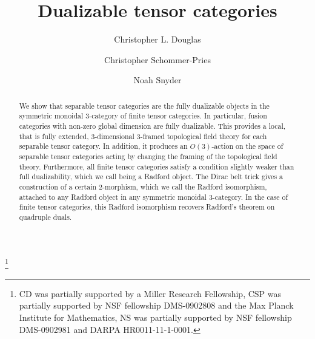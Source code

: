 \documentclass{amsart}
\begin{document}
\title{Dualizable tensor categories}

\begin{abstract}
We show that separable tensor categories are the fully dualizable objects in the symmetric monoidal $3$-category of finite tensor categories.  In particular, fusion categories with non-zero global dimension are fully dualizable.   This provides a local, that is fully extended, 3-dimensional 3-framed topological field theory for each separable tensor category. In addition, it produces an $O(3)$-action on the space of separable tensor categories acting by changing the framing of the topological field theory. Furthermore, all finite tensor categories satisfy a condition slightly weaker than full dualizability, which we call being a Radford object.  The Dirac belt trick gives a construction of a certain $2$-morphism, which we call the Radford isomorphism, attached to any Radford object in any symmetric monoidal $3$-category.  In the case of finite tensor categories, this Radford isomorphism recovers Radford's theorem on quadruple duals.

\end{abstract}

\author{Christopher L. Douglas}
\address{Mathematical Institute\\ University of Oxford\\ Oxford OX1 3LB\\ United Kingdom}
      	
\author{Christopher Schommer-Pries}
\address{Department of Mathematics\\ Max Planck Institute for Mathematics \\ 53111 Bonn \\ Germany}

\author{Noah Snyder}
\address{Department of Mathematics\\ Indiana University\\ Bloomington, IN 47401\\ USA}

\thanks{CD was partially supported by a Miller Research Fellowship, CSP was partially supported by NSF fellowship DMS-0902808 and the Max Planck Institute for Mathematics,  NS was partially supported by NSF fellowship DMS-0902981 and DARPA HR0011-11-1-0001.
}
\end{document}
